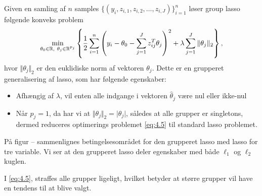 Given en samling af $n$ samples \(\{(y_i, z_{i,1}, z_{i,2}, \ldots, z_{i,J})\}_{i=1}^n\) løser group lasso følgende konveks problem
\begin{align}
\min_{\theta_0 \in \R, \ \theta_j \in \R^{p_j}} \cbr{\frac{1}{2} \sum_{i=1}^n \del{y_i - \theta_0 - \sum_{j=1}^J z_{ij}^T \theta_j}^2 + \lambda \sum_{j=1}^J \Vert \theta_j \Vert_2},\label{eq:4.5}
\end{align}
hvor $\Vert \theta_j \Vert_2$ er den euklidiske norm af vektoren $\theta_j$.
Dette er en grupperet generalisering af lasso, som har følgende egenskaber:
\begin{itemize}
\item Afhængig af $\lambda$, vil enten alle indgange i vektoren $\hat{\theta}_j$ være nul eller ikke-nul
\item Når $p_j=1$, da har vi at $\Vert \theta_j \Vert_2 = \vert \theta_j \vert$, således at alle grupper er singletons, dermed reduceres optimerings problemet \eqref{eq:4.5} til standard lasso problemet.
\end{itemize}
På figur -- sammenlignes betingelsesområdet for den grupperet lasso med lasso for tre variable.
Vi ser at den grupperet lasso deler egenskaber med både $\ell_1$ og $\ell_2$ kuglen.

I \eqref{eq:4.5}, straffes alle grupper ligeligt, hvilket betyder at større grupper vil have en tendens til at blive valgt.


